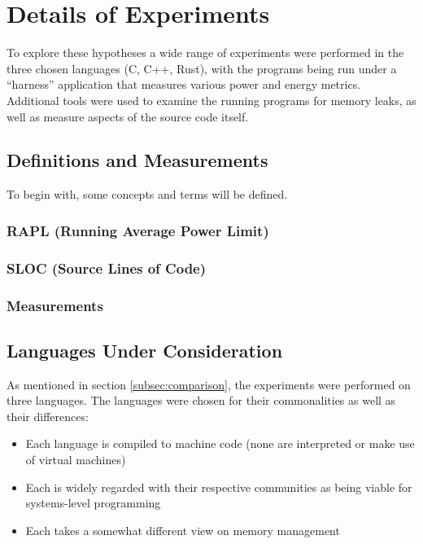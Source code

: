 \section{Details of Experiments}
\label{sec:experiments}

To explore these hypotheses a wide range of experiments were performed in the three chosen languages (C, C++, Rust), with the programs being run under a ``harness'' application that measures various power and energy metrics. Additional tools were used to examine the running programs for memory leaks, as well as measure aspects of the source code itself.

\subsection{Definitions and Measurements}

To begin with, some concepts and terms will be defined.

\subsubsection{RAPL (Running Average Power Limit)}

\subsubsection{SLOC (Source Lines of Code)}

\subsubsection{Measurements}

\subsection{Languages Under Consideration}

As mentioned in section \ref{subsec:comparison}, the experiments were performed on three languages. The languages were chosen for their commonalities as well as their differences:

\begin{itemize}
\item Each language is compiled to machine code (none are interpreted or make use of virtual machines)
\item Each is widely regarded with their respective communities as being viable for systems-level programming
\item Each takes a somewhat different view on memory management
\end{itemize}

